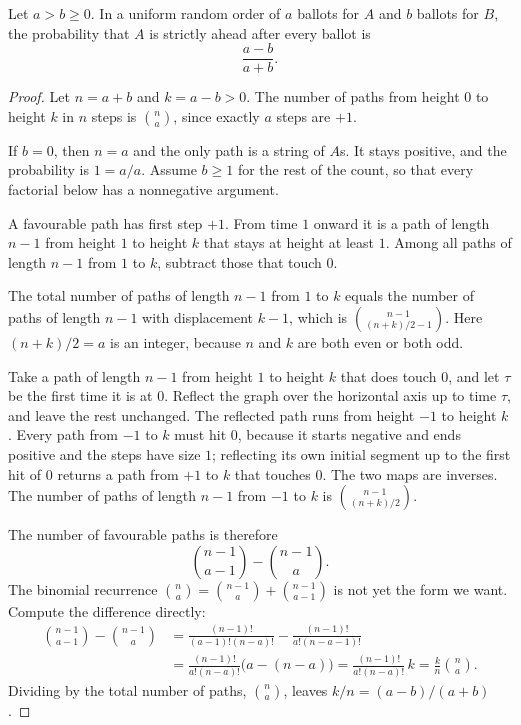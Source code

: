 \begin{theorem}\label{thm:ballot}
Let $a>b\ge0$. In a uniform random order of $a$ ballots for $A$ and $b$ ballots for $B$, the probability that $A$ is strictly ahead after every ballot is
\[
 \frac{a-b}{a+b}.
\]
\end{theorem}
\begin{proof}
Let $n=a+b$ and $k=a-b>0$. The number of paths from height $0$ to height $k$ in $n$ steps is $\binom{n}{a}$, since exactly $a$ steps are $+1$.

If $b=0$, then $n=a$ and the only path is a string of $A$s. It stays positive, and the probability is $1=a/a$. Assume $b\ge1$ for the rest of the count, so that every factorial below has a nonnegative argument.

A favourable path has first step $+1$. From time $1$ onward it is a path of length $n-1$ from height $1$ to height $k$ that stays at height at least $1$. Among all paths of length $n-1$ from $1$ to $k$, subtract those that touch $0$.

The total number of paths of length $n-1$ from $1$ to $k$ equals the number of paths of length $n-1$ with displacement $k-1$, which is $\binom{n-1}{(n+k)/2-1}$. Here $(n+k)/2=a$ is an integer, because $n$ and $k$ are both even or both odd.

Take a path of length $n-1$ from height $1$ to height $k$ that does touch $0$, and let $\tau$ be the first time it is at $0$. Reflect the graph over the horizontal axis up to time $\tau$, and leave the rest unchanged. The reflected path runs from height $-1$ to height $k$. Every path from $-1$ to $k$ must hit $0$, because it starts negative and ends positive and the steps have size $1$; reflecting its own initial segment up to the first hit of $0$ returns a path from $+1$ to $k$ that touches $0$. The two maps are inverses. The number of paths of length $n-1$ from $-1$ to $k$ is $\binom{n-1}{(n+k)/2}$.

The number of favourable paths is therefore
\[
 \binom{n-1}{a-1}-\binom{n-1}{a}.
\]
The binomial recurrence $\binom{n}{a}=\binom{n-1}{a}+\binom{n-1}{a-1}$ is not yet the form we want. Compute the difference directly:
\begin{align*}
\binom{n-1}{a-1}-\binom{n-1}{a}
&=\frac{(n-1)!}{(a-1)!(n-a)!}-\frac{(n-1)!}{a!(n-a-1)!}\\
&=\frac{(n-1)!}{a!(n-a)!}\bigl(a-(n-a)\bigr)
=\frac{(n-1)!}{a!(n-a)!}\,k
=\frac{k}{n}\binom{n}{a}.
\end{align*}
Dividing by the total number of paths, $\binom{n}{a}$, leaves $k/n=(a-b)/(a+b)$.
\end{proof}

